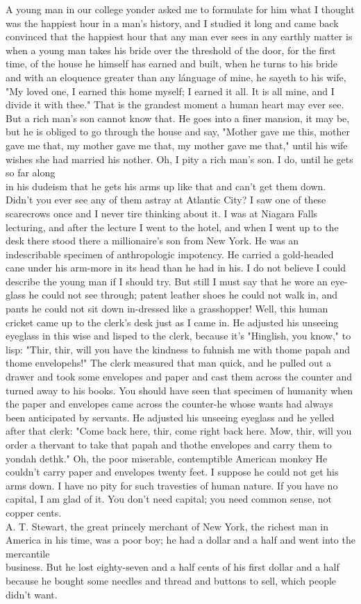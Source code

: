 \documentclass[10pt]{article}
\begin{document}
A young man in our college yonder asked me to formulate for him what I thought was the happiest hour in a man's history, and I studied it long and came back convinced that the happiest hour that any man ever sees in any earthly matter is when a young man takes his bride over the threshold of the door, for the first time, of the house he himself has earned and built, when he turns to his bride and with an eloquence greater than any lánguage of mine, he sayeth to his wife, "My loved one, I earned this home myself; I earned it all. It is all mine, and I divide it with thee." That is the grandest moment a human heart may ever see. But a rich man's son cannot know that. He goes into a finer mansion, it may be, but he is obliged to go through the house and say, "Mother gave me this, mother gave me that, my mother gave me that, my mother gave me that," until his wife wishes she had married his nother. Oh, I pity a rich man's son. I do, until he gets so far along\\
in his dudeism that he gets his arms up like that and can't get them down. Didn't you ever see any of them astray at Atlantic City? I saw one of these scarecrows once and I never tire thinking about it. I was at Niagara Falls lecturing, and after the lecture I went to the hotel, and when I went up to the desk there stood there a millionaire's son from New York. He was an indescribable specimen of anthropologic impotency. He carried a gold-headed cane under his arm-more in its head than he had in his. I do not believe I could describe the young man if I should try. But still I must say that he wore an eye-glass he could not see through; patent leather shoes he could not walk in, and pants he could not sit down in-dressed like a grasshopper! Well, this human cricket came up to the clerk's desk just as I came in. He adjusted his unseeing eyeglass in this wise and lisped to the clerk, because it's "Hinglish, you know," to lisp: "Thir, thir, will you have the kindness to fuhnish me with thome papah and thome envelopehs!" The clerk measured that man quick, and he pulled out a drawer and took some envelopes and paper and cast them across the counter and turned away to his books. You should have seen that specimen of humanity when the paper and envelopes came across the counter-he whose wants had always been anticipated by servants. He adjusted his unseeing eyeglass and he yelled after that clerk: "Come back here, thir, come right back here. Mow, thir, will you order a thervant to take that papah and thothe envelopes and carry them to yondah dethk." Oh, the poor miserable, contemptible American monkey He couldn't carry paper and envelopes twenty feet. I suppose he could not get his arms down. I have no pity for such travesties of human nature. If you have no capital, I am glad of it. You don't need capital; you need common sense, not copper cents.\\
A. T. Stewart, the great princely merchant of New York, the richest man in America in his time, was a poor boy; he had a dollar and a half and went into the mercantile\\
business. But he lost eighty-seven and a half cents of his first dollar and a half because he bought some needles and thread and buttons to sell, which people didn't want.
\end{document}
